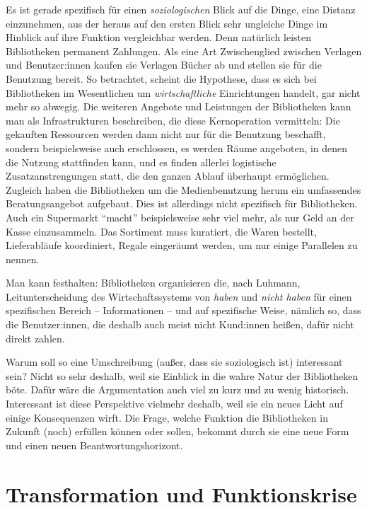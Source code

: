 \documentclass[a4paper,
fontsize=11pt,
oneside,
numbers=noperiodatend,
parskip=half-,
bibliography=totoc,
final
]{scrartcl}
\begin{document}
Es ist gerade spezifisch für einen \emph{soziologischen} Blick auf die
Dinge, eine Distanz einzunehmen, aus der heraus auf den ersten Blick
sehr ungleiche Dinge im Hinblick auf ihre Funktion vergleichbar werden.
Denn natürlich leisten Bibliotheken permanent Zahlungen. Als eine Art
Zwischenglied zwischen Verlagen und Benutzer:innen kaufen sie Verlagen
Bücher ab und stellen sie für die Benutzung bereit. So betrachtet,
scheint die Hypothese, dass es sich bei Bibliotheken im Wesentlichen um
\emph{wirtschaftliche} Einrichtungen handelt, gar nicht mehr so abwegig.
Die weiteren Angebote und Leistungen der Bibliotheken kann man als
Infrastrukturen beschreiben, die diese Kernoperation vermitteln: Die
gekauften Ressourcen werden dann nicht nur für die Benutzung beschafft,
sondern beispielsweise auch erschlossen, es werden Räume angeboten, in
denen die Nutzung stattfinden kann, und es finden allerlei logistische
Zusatzanstrengungen statt, die den ganzen Ablauf überhaupt ermöglichen.
Zugleich haben die Bibliotheken um die Medienbenutzung herum ein
umfassendes Beratungsangebot aufgebaut. Dies ist allerdings nicht
spezifisch für Bibliotheken. Auch ein Supermarkt \enquote{macht}
beispielsweise sehr viel mehr, als nur Geld an der Kasse einzusammeln.
Das Sortiment muss kuratiert, die Waren bestellt, Lieferabläufe
koordiniert, Regale eingeräumt werden, um nur einige Parallelen zu
nennen.

Man kann festhalten: Bibliotheken organisieren die, nach Luhmann,
Leitunterscheidung des Wirtschaftssystems von \emph{haben} und
\emph{nicht haben} für einen spezifischen Bereich -- Informationen --
und auf spezifische Weise, nämlich so, dass die Benutzer:innen, die
deshalb auch meist nicht Kund:innen heißen, dafür nicht direkt zahlen.

Warum soll so eine Umschreibung (außer, dass sie soziologisch ist)
interessant sein? Nicht so sehr deshalb, weil sie Einblick in die wahre
Natur der Bibliotheken böte. Dafür wäre die Argumentation auch viel zu
kurz und zu wenig historisch. Interessant ist diese Perspektive vielmehr
deshalb, weil sie ein neues Licht auf einige Konsequenzen wirft. Die
Frage, welche Funktion die Bibliotheken in Zukunft (noch) erfüllen
können oder sollen, bekommt durch sie eine neue Form und einen neuen
Beantwortungshorizont.

\hypertarget{transformation-und-funktionskrise}{%
\section{Transformation und
Funktionskrise}\label{transformation-und-funktionskrise}}
\end{document}
